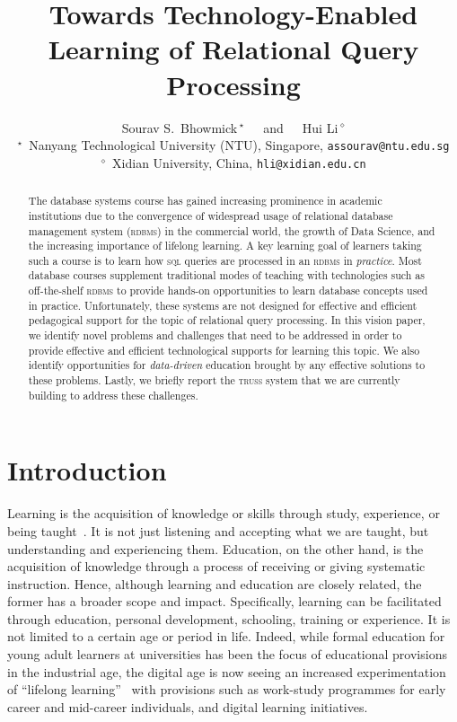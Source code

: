 \documentclass[11pt]{article}
\begin{document}
\title{Towards Technology-Enabled Learning of Relational Query Processing}
\author{Sourav S.\ Bhowmick$\,^{\star}$~~~and~~~Hui Li$\,^{\diamond}$\\ $^{\star}$~Nanyang Technological University (NTU), Singapore, \texttt{assourav@ntu.edu.sg}\\
$^{\diamond}$~Xidian University, China, \texttt{hli@xidian.edu.cn}
}
\maketitle

\begin{abstract}
The database systems course has gained increasing prominence in academic institutions due to the convergence of widespread usage of relational database management system (\textsc{rdbms}) in the commercial world, the growth of Data Science, and the increasing importance of lifelong learning. A key learning goal of learners taking such a course is to learn how \textsc{sql} queries are processed in an \textsc{rdbms} in \emph{practice}. Most database courses supplement traditional modes of teaching with technologies such as off-the-shelf \textsc{rdbms} to provide hands-on opportunities to learn database concepts used in practice. Unfortunately, these systems are not designed for effective and efficient pedagogical support for the topic of relational query processing. In this vision paper, we identify novel problems and challenges that need to be addressed in order to provide effective and efficient technological supports for learning this topic. We also identify opportunities for \textit{data-driven} education brought by any effective solutions to these problems. Lastly, we briefly report the \textsc{truss} system that we are currently building to address these challenges.
\end{abstract}


\section{Introduction}  %
\label{sec1}
Learning is the acquisition of knowledge or skills through study, experience, or being taught~\cite{Gross}.  It is not just listening and accepting what we are taught, but understanding and experiencing them. Education, on the other hand, is the acquisition of knowledge through a process of receiving or giving systematic instruction. Hence, although learning and education are closely related, the former has a broader scope and impact. Specifically, learning can be facilitated through education, personal development, schooling, training or experience. It is not limited to a certain age or period in life. Indeed, while formal education for young adult learners at universities has been the focus of educational provisions in the industrial age, the digital age is now seeing an increased experimentation of  ``lifelong learning''~\cite{unesco} with provisions such as  work-study programmes for early career and mid-career individuals, and digital learning initiatives.
\end{document}

